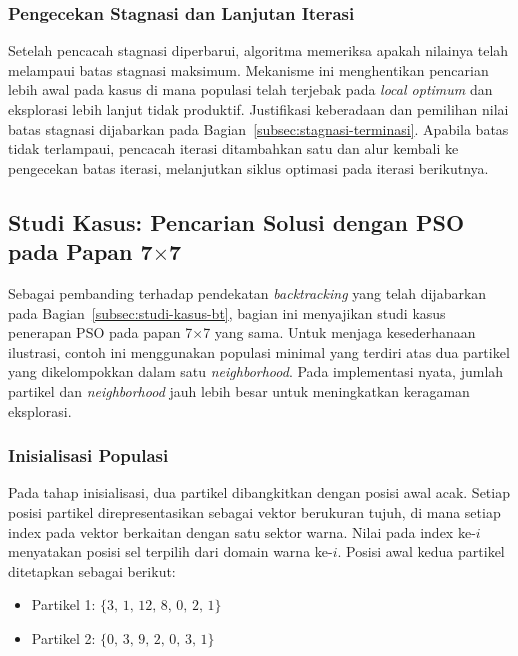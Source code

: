 \subsubsection{Pengecekan Stagnasi dan Lanjutan Iterasi}

Setelah pencacah stagnasi diperbarui, algoritma memeriksa apakah nilainya telah melampaui batas stagnasi maksimum. Mekanisme ini menghentikan pencarian lebih awal pada kasus di mana populasi telah terjebak pada \textit{local optimum} dan eksplorasi lebih lanjut tidak produktif. Justifikasi keberadaan dan pemilihan nilai batas stagnasi dijabarkan pada Bagian~\ref{subsec:stagnasi-terminasi}. Apabila batas tidak terlampaui, pencacah iterasi ditambahkan satu dan alur kembali ke pengecekan batas iterasi, melanjutkan siklus optimasi pada iterasi berikutnya.

\subsection{Studi Kasus: Pencarian Solusi dengan PSO pada Papan 7$\times$7}
\label{subsec:studi-kasus-pso}

Sebagai pembanding terhadap pendekatan \textit{backtracking} yang telah dijabarkan pada Bagian~\ref{subsec:studi-kasus-bt}, bagian ini menyajikan studi kasus penerapan PSO pada papan 7$\times$7 yang sama. Untuk menjaga kesederhanaan ilustrasi, contoh ini menggunakan populasi minimal yang terdiri atas dua partikel yang dikelompokkan dalam satu \textit{neighborhood}. Pada implementasi nyata, jumlah partikel dan \textit{neighborhood} jauh lebih besar untuk meningkatkan keragaman eksplorasi.

\subsubsection{Inisialisasi Populasi}

Pada tahap inisialisasi, dua partikel dibangkitkan dengan posisi awal acak. Setiap posisi partikel direpresentasikan sebagai vektor berukuran tujuh, di mana setiap index pada vektor berkaitan dengan satu sektor warna. Nilai pada index ke-$i$ menyatakan posisi sel terpilih dari domain warna ke-$i$. Posisi awal kedua partikel ditetapkan sebagai berikut:

\begin{itemize}
	\item Partikel 1: $\{3,\, 1,\, 12,\, 8,\, 0,\, 2,\, 1\}$
	\item Partikel 2: $\{0,\, 3,\, 9,\, 2,\, 0,\, 3,\, 1\}$
\end{itemize}

